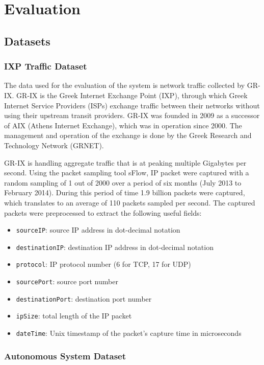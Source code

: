 \chapter{Evaluation}\label{chapter:evaluation}

\section{Datasets}

\subsection{IXP Traffic Dataset}

The data used for the evaluation of the system is network traffic collected by GR-IX. GR-IX is the Greek  Internet Exchange Point (IXP), through which Greek Internet Service Providers (ISPs) exchange traffic between their networks without using their upstream transit providers. GR-IX was founded in 2009 as a successor of AIX (Athens Internet Exchange), which was in operation since 2000. The management and operation of the exchange is done by the Greek Research and Technology Network (GRNET).

GR-IX is handling aggregate traffic that is at peaking multiple Gigabytes per second. Using the packet sampling tool sFlow, IP packet were captured with a random sampling of 1 out of 2000 over a period of six months (July 2013 to February 2014). During this period of time 1.9 billion packets were captured, which translates to an average of 110 packets sampled per second. The captured packets were preprocessed to extract the following useful fields:
\begin{itemize}
\item \texttt{sourceIP}: source IP address in dot-decimal notation
\item \texttt{destinationIP}: destination IP address in dot-decimal notation
\item \texttt{protocol}: IP protocol number (6 for TCP, 17 for UDP)
\item \texttt{sourcePort}: source port number
\item \texttt{destinationPort}: destination port number
\item \texttt{ipSize}: total length of the IP packet
\item \texttt{dateTime}: Unix timestamp of the packet's capture time in microseconds
\end{itemize}

\subsection{Autonomous System Dataset}\label{subsection:benchmarks_as_dataset}

